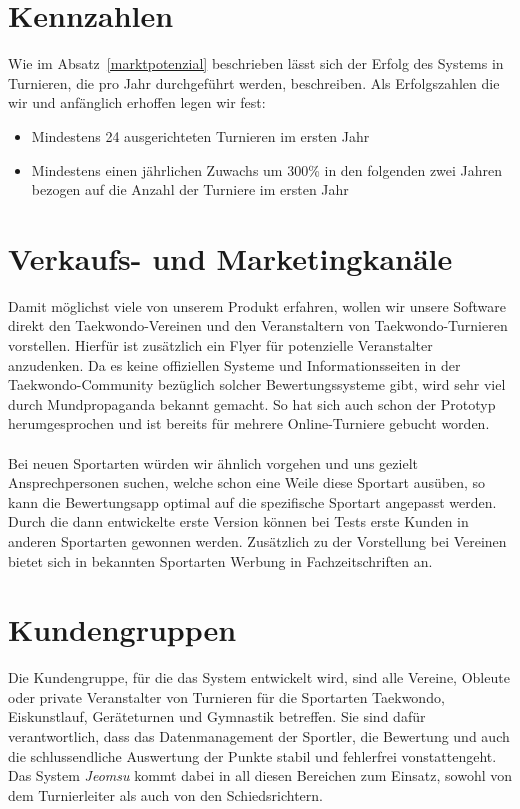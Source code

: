 \section{Kennzahlen}

Wie im Absatz~\ref{marktpotenzial} beschrieben lässt sich der Erfolg des Systems in Turnieren, die pro Jahr
durchgeführt werden, beschreiben.
Als Erfolgszahlen die wir und anfänglich erhoffen legen wir fest:
\begin{itemize}
	\item Mindestens 24 ausgerichteten Turnieren im ersten Jahr
	\item Mindestens einen jährlichen Zuwachs um 300\% in den folgenden zwei Jahren bezogen auf die Anzahl der
	Turniere im ersten Jahr
\end{itemize}

\section{Verkaufs- und Marketingkanäle}

Damit möglichst viele von unserem Produkt erfahren, wollen wir unsere Software direkt den Taekwondo-Vereinen und
den Veranstaltern von Taekwondo-Turnieren vorstellen.
Hierfür ist zusätzlich ein Flyer für potenzielle Veranstalter anzudenken.
Da es keine offiziellen Systeme und Informationsseiten in der Taekwondo-Community bezüglich solcher Bewertungssysteme
gibt, wird sehr viel durch Mundpropaganda bekannt gemacht.
So hat sich auch schon der Prototyp herumgesprochen und ist bereits für mehrere Online-Turniere gebucht worden.
\\\\
Bei neuen Sportarten würden wir ähnlich vorgehen und uns gezielt Ansprechpersonen suchen, welche schon eine Weile diese
Sportart ausüben, so kann die Bewertungsapp optimal auf die spezifische Sportart angepasst werden.
Durch die dann entwickelte erste Version können bei Tests erste Kunden in anderen Sportarten gewonnen werden.
Zusätzlich zu der Vorstellung bei Vereinen bietet sich in bekannten Sportarten Werbung in Fachzeitschriften an.

\section{Kundengruppen}

Die Kundengruppe, für die das System entwickelt wird, sind alle Vereine, Obleute oder private Veranstalter von
	Turnieren für die Sportarten Taekwondo, Eiskunstlauf, Geräteturnen und Gymnastik betreffen.
Sie sind dafür verantwortlich, dass das Datenmanagement der Sportler, die Bewertung und auch die schlussendliche
	Auswertung der Punkte stabil und fehlerfrei vonstattengeht.
Das System \textit{Jeomsu} kommt dabei in all diesen Bereichen zum Einsatz, sowohl von dem Turnierleiter als auch von
	den Schiedsrichtern.